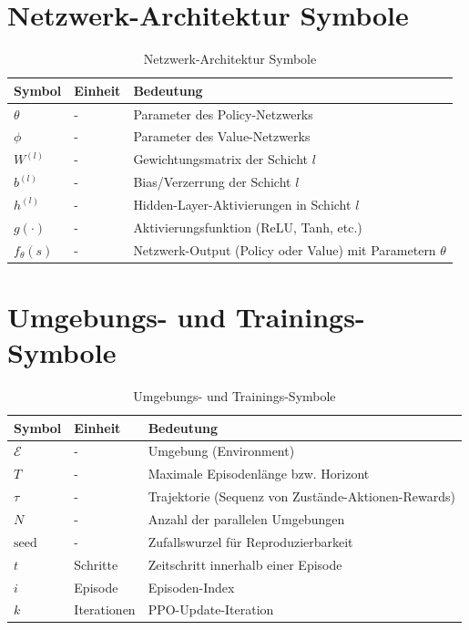 \section{Netzwerk-Architektur Symbole}

\begin{table}[htbp]
	\centering
	\begin{tabular}{lll}
		\toprule
		\textbf{Symbol} & \textbf{Einheit} & \textbf{Bedeutung} \\
		\midrule
		$\theta$ & - & Parameter des Policy-Netzwerks \\
		$\phi$ & - & Parameter des Value-Netzwerks \\
		$W^{(l)}$ & - & Gewichtungsmatrix der Schicht $l$ \\
		$b^{(l)}$ & - & Bias/Verzerrung der Schicht $l$ \\
		$h^{(l)}$ & - & Hidden-Layer-Aktivierungen in Schicht $l$ \\
		$g(\cdot)$ & - & Aktivierungsfunktion (ReLU, Tanh, etc.) \\
		$f_\theta(s)$ & - & Netzwerk-Output (Policy oder Value) mit Parametern $\theta$ \\
		\bottomrule
	\end{tabular}
	\caption{Netzwerk-Architektur Symbole}
\end{table}

\section{Umgebungs- und Trainings-Symbole}

\begin{table}[htbp]
	\centering
	\begin{tabular}{lll}
		\toprule
		\textbf{Symbol} & \textbf{Einheit} & \textbf{Bedeutung} \\
		\midrule
		$\mathcal{E}$ & - & Umgebung (Environment) \\
		$T$ & - & Maximale Episodenlänge bzw. Horizont \\
		$\tau$ & - & Trajektorie (Sequenz von Zustände-Aktionen-Rewards) \\
		$N$ & - & Anzahl der parallelen Umgebungen \\
		$\text{seed}$ & - & Zufallswurzel für Reproduzierbarkeit \\
		$t$ & Schritte & Zeitschritt innerhalb einer Episode \\
		$i$ & Episode & Episoden-Index \\
		$k$ & Iterationen & PPO-Update-Iteration \\
		\bottomrule
	\end{tabular}
	\caption{Umgebungs- und Trainings-Symbole}
	\label{tab:symbols_training}
\end{table}


